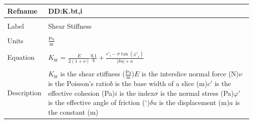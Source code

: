 \documentclass[12pt]{article}
\begin{document}
\noindent \begin{minipage}{\textwidth}
\begin{tabular}{p{} p{}}
\toprule \textbf{Refname} & \textbf{DD:K.bt,i}
\label{DD:K.bt,i}
\\ \midrule \\
Label & Shear Stiffness
\\ \midrule \\
Units & $\frac{\text{Pa}}{\text{m}}$
\\ \midrule \\
Equation & ${K_{bt}}$ = $\frac{E}{2 \left(1+\nu{}\right)} \frac{0.1}{b}+\frac{{c'}_{i}-\sigma{} \tan\left({\varphi{}'}_{i}\right)}{|\delta{}u|+a}$
\\ \midrule \\
Description & ${K_{bt}}$ is the shear stiffness ($\frac{\text{Pa}}{\text{m}}$)\newline$E$ is the interslice normal force (N)\newline$\nu{}$ is the Poisson's ratio\newline$b$ is the base width of a slice (m)\newline$c'$ is the effective cohesion (Pa)\newline$i$ is the index\newline$\sigma{}$ is the normal stress (Pa)\newline$\varphi{}'$ is the effective angle of friction (${}^{\circ}$)\newline$\delta{}u$ is the displacement (m)\newline$a$ is the constant (m)
\\ \bottomrule \end{tabular}
\end{minipage}\\
~\newline
\end{document}
